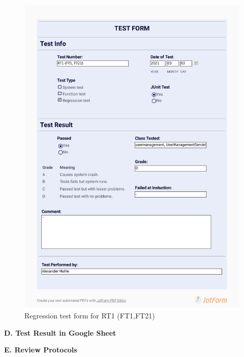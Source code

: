 \documentclass{article}
\begin{document}
  \begin{figure}
     \centering
     \includegraphics[width=13cm]{images/2021-03-03_Alexander_RT1(FT1, FT21)-1.jpg}
     \renewcommand\figurename{Figure}
     \caption{Regression test form for RT1 (FT1,FT21)}
     \label{fig:my_label}
 \end{figure}


\newpage
\begin{flushleft}
{\large \textbf{D. Test Result in Google Sheet}}
\end{flushleft}

\newpage
\begin{flushleft}
{\large \textbf{E. Review Protocols}}
\end{flushleft}


\end{document}
